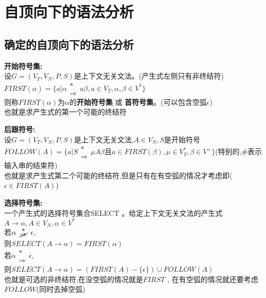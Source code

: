 \documentclass[UTF8,a4paper]{ctexart}
\newcommand{\spaceline}{\vspace{\baselineskip}}
\begin{document}
  \section{自顶向下的语法分析}
  \subsection{确定的自顶向下的语法分析}

  \textbf{开始符号集:}\\
  设$G = (V_T , V_N , P , S)$是上下文无关文法。(产生式左侧只有非终结符)\\
  $\renewcommand{\arraystretch}{0.5}
  FIRST(\alpha) = \{a | \alpha \begin{array}{c} * \\ \Rightarrow \end{array}  a \beta , a \in V_T , \alpha ,\beta\in V^*\}$\\
  则称$\renewcommand{\arraystretch}{0.5}
  FIRST(\alpha)$为$\alpha$的\textbf{开始符号集} 或 \textbf{首符号集}。(可以包含空弧$\epsilon$)\\
  {\color{blue} 也就是求产生式的第一个可能的终结符}

  \spaceline
  \textbf{后跟符号:}\\
  设$G = (V_T , V_N , P , S)$是上下文无关文法,$A\in V_N , S$是开始符号\\
  $\renewcommand{\arraystretch}{0.5}FOLLOW(A) = \{ a | S \begin{array}{c} * \\ \Rightarrow \end{array}
  \mu A\beta\text{且}a\in FIRST(\beta) ,\mu\in V^*_T , \beta\in V^+ \}$(特别的,\#表示输入串的结束符)\\
  {\color{blue} 也就是求产生式第二个可能的终结符,但是只有在有空弧的情况才考虑即($\epsilon \in FIRST(A)$)}

  \spaceline
  \textbf{选择符号集:}\\
  一个产生式的选择符号集合SELECT 。给定上下文无关文法的产生式\\
  $A\to \alpha , A\in V_N , \alpha \in V^*$\\
  若$\renewcommand{\arraystretch}{0.5} \alpha \begin{array}{c} * \\ \cancel{\Rightarrow} \end{array} \epsilon $,\\
  则$SELECT(A \to \alpha) = FIRST(\alpha)$\\
  若$\renewcommand{\arraystretch}{0.5} \alpha \begin{array}{c} * \\ \Rightarrow \end{array} \epsilon $,\\
  则$SELECT(A \to \alpha) = (FIRST(A) - \{\epsilon\})\cup FOLLOW(A)$\\
  {\color{blue} 也就是可选的非终结符,在没空弧的情况就是$FIRST$ , 在有空弧的情况就还要考虑$FOLLOW$(同时去掉空弧)}
\end{document}

